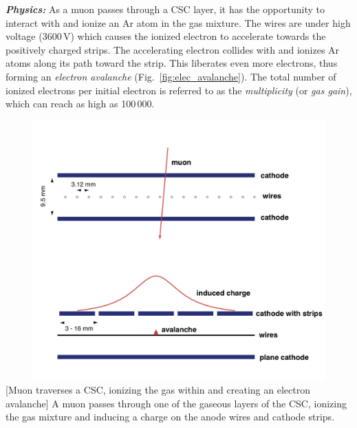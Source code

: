 \textit{\textbf{Physics:}}
As a muon passes through a CSC layer, it has the opportunity to interact with and ionize an Ar atom in the gas mixture.
The wires are under high voltage (3600\,V) which causes the ionized electron to accelerate towards the positively charged strips.
The accelerating electron collides with and ionizes Ar atoms along its path toward the strip.
This liberates even more electrons, thus forming an \emph{electron avalanche} (Fig.~\ref{fig:elec_avalanche}).
The total number of ionized electrons per initial electron is referred to as the \emph{multiplicity} (or \emph{gas gain}), which can reach as high as 100\,000.
\begin{multiFigure}
    \centering
    \includegraphics[width=15cm,height=10cm,keepaspectratio]{figures/cms/muonsys/csc_elec_avalanche_old.png}
        [Muon traverses a CSC, ionizing the gas within and creating an electron avalanche]
        {A muon passes through one of the gaseous layers of the CSC, ionizing the gas mixture and inducing a charge on the anode wires and cathode strips.}
    \label{fig:elec_avalanche}
\end{multiFigure}

